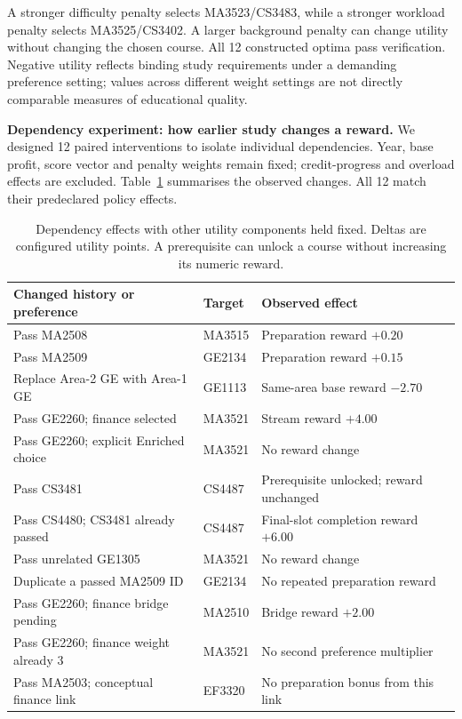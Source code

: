 \documentclass{article}
\begin{document}
A stronger difficulty penalty selects MA3523/CS3483, while a stronger workload penalty selects MA3525/CS3402. A larger background penalty can change utility without changing the chosen course. All 12 constructed optima pass verification. Negative utility reflects binding study requirements under a demanding preference setting; values across different weight settings are not directly comparable measures of educational quality.

\textbf{Dependency experiment: how earlier study changes a reward.} We designed 12 paired interventions to isolate individual dependencies. Year, base profit, score vector and penalty weights remain fixed; credit-progress and overload effects are excluded. Table~\ref{tab:dependency} summarises the observed changes. All 12 match their predeclared policy effects.

\begin{table}[H]
\centering\small
\caption{Dependency effects with other utility components held fixed. Deltas are configured utility points. A prerequisite can unlock a course without increasing its numeric reward.}
\begin{tabular}{p{2.2in}p{0.65in}p{2.15in}}
\toprule
Changed history or preference & Target & Observed effect\\
\midrule
Pass MA2508 & MA3515 & Preparation reward $+0.20$\\
Pass MA2509 & GE2134 & Preparation reward $+0.15$\\
Replace Area-2 GE with Area-1 GE & GE1113 & Same-area base reward $-2.70$\\
Pass GE2260; finance selected & MA3521 & Stream reward $+4.00$\\
Pass GE2260; explicit Enriched choice & MA3521 & No reward change\\
Pass CS3481 & CS4487 & Prerequisite unlocked; reward unchanged\\
Pass CS4480; CS3481 already passed & CS4487 & Final-slot completion reward $+6.00$\\
Pass unrelated GE1305 & MA3521 & No reward change\\
Duplicate a passed MA2509 ID & GE2134 & No repeated preparation reward\\
Pass GE2260; finance bridge pending & MA2510 & Bridge reward $+2.00$\\
Pass GE2260; finance weight already 3 & MA3521 & No second preference multiplier\\
Pass MA2503; conceptual finance link & EF3320 & No preparation bonus from this link\\
\bottomrule
\end{tabular}
\label{tab:dependency}
\end{table}
\end{document}
